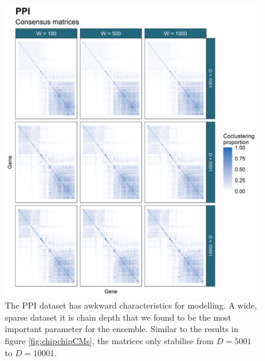 \documentclass[]{article}
\begin{document}
\begin{figure}
	\centering
	\includegraphics[scale=0.8]{./Images/Yeast/PPICMcomparison.png}
	\caption{The PPI dataset has awkward characteristics for modelling. A wide, sparse dataset it is chain depth that we found to be the most important parameter for the ensemble. Similar to the results in figure \ref{fig:chipchipCMs}, the matrices only stabilise from $D=5001$ to $D=10001$.}
	\label{fig:ppiCMs}
\end{figure}
\end{document}
